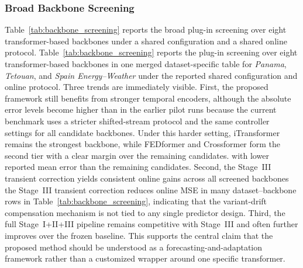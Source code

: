 ﻿\documentclass[journal]{IEEEtran}
\DeclareRobustCommand{\oldtext}[1]{{\color{revisionred}#1}}
\DeclareRobustCommand{\newtext}[1]{{\color{revisionblue}#1}}
\DeclareRobustCommand{\why}[1]{{\color{revisionblue}{\footnotesize (#1)}}}
\DeclareRobustCommand{\rw}[3]{\oldtext{#1} \newtext{#2}\why{#3}}
\begin{document}
\subsubsection{Broad Backbone Screening}
\rw{Table~\ref{tab:backbone_screening} reports the broad plug-in screening over eight transformer-based backbones under a shared configuration and a shared online protocol.}{Table~\ref{tab:backbone_screening} reports the plug-in screening over eight transformer-based backbones in one merged dataset-specific table for \textit{Panama}, \textit{Tetouan}, and \textit{Spain Energy--Weather} under the reported shared configuration and online protocol.}{原 Table III 为三数据集均值；现在改为一个合并表，不再使用 Panel A/B/C。} Three trends are immediately visible. First, the proposed framework still benefits from stronger temporal encoders, although the absolute error levels become higher than in the earlier pilot runs because the current benchmark uses a stricter shifted-stream protocol and the same controller settings for all candidate backbones. Under this harder setting, iTransformer remains the strongest backbone, while FEDformer and Crossformer form the second tier \rw{with a clear margin over the remaining candidates.}{with lower reported mean error than the remaining candidates.}{避免未给统计检验时使用 clear margin。} Second, \rw{the Stage~III transient correction yields consistent online gains across all screened backbones}{the Stage~III transient correction reduces online MSE in many dataset--backbone rows in Table~\ref{tab:backbone_screening}}{集中为一个表后，正文引用同步改为 Table III。}, indicating that the variant-drift compensation mechanism is not tied to any single predictor design. Third, the full Stage~I+II+III pipeline remains competitive with Stage~III and often further improves over the frozen baseline. This supports the central claim that the proposed method should be understood as a forecasting-and-adaptation framework rather than a customized wrapper around one specific transformer.
\end{document}
